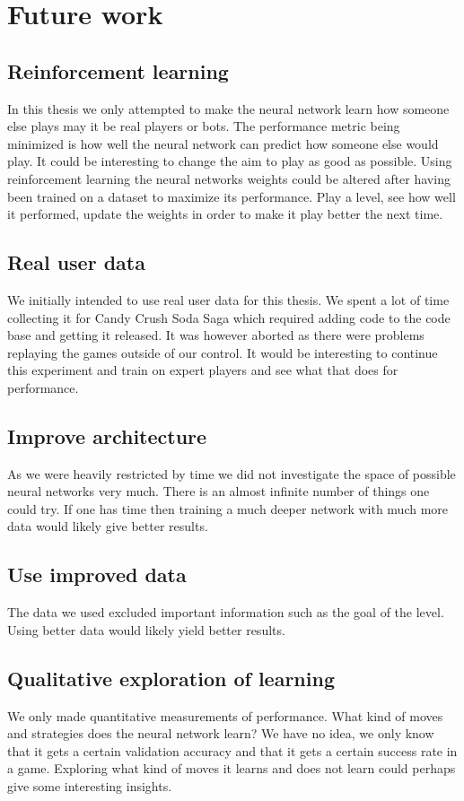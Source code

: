 \documentclass{kththesis}
\begin{document}
\chapter{Future work}
\section{Reinforcement learning}
In this thesis we only attempted to make the neural network learn how someone else plays  may it be real players or bots. The performance metric being minimized is how well the neural network can predict how someone else would play. It could be interesting to change the aim to play as good as possible. Using reinforcement learning the neural networks weights  could be altered after having been trained on a dataset to maximize its performance. Play a level, see how well it performed, update the weights in order to make it play better the next time. 

\section{Real user data}
We initially intended to use  real user data for this thesis. We spent a lot of time collecting  it for Candy Crush Soda Saga which required adding code to the code base and getting it released.  It was however aborted as there were problems replaying the games outside of our control.  It would be interesting to continue this experiment and train on expert players and see what that does for performance.

\section{Improve architecture}
As we were heavily restricted by time  we did not investigate the space of possible neural networks very much.  There is an almost infinite number of things one could try. If one has time then training a much deeper network with much more data would likely give better results.

\section{Use improved data}
The data we used excluded important information such as the goal of the level. Using better data would likely yield better results.

\section{Qualitative exploration of learning}
We only made quantitative measurements of performance. What kind of moves and strategies does the neural network learn? We have no idea, we only know that it gets a certain validation accuracy and that it gets a certain success rate in a game. Exploring what kind of moves  it learns and does not learn could perhaps give some interesting insights.


\end{document}
